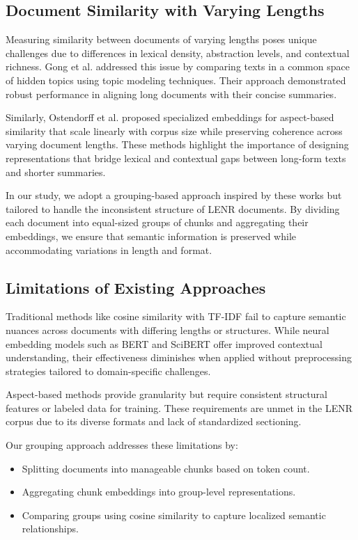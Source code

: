 \documentclass[12pt]{article}
\begin{document}
    \subsection{Document Similarity with Varying Lengths}
    
    Measuring similarity between documents of varying lengths poses unique challenges due to differences in lexical density, abstraction levels, and contextual richness. Gong et al. \cite{gong2018hidden} addressed this issue by comparing texts in a common space of hidden topics using topic modeling techniques. Their approach demonstrated robust performance in aligning long documents with their concise summaries.
    
    Similarly, Ostendorff et al. \cite{ostendorff2022specialized} proposed specialized embeddings for aspect-based similarity that scale linearly with corpus size while preserving coherence across varying document lengths. These methods highlight the importance of designing representations that bridge lexical and contextual gaps between long-form texts and shorter summaries.
    
    In our study, we adopt a grouping-based approach inspired by these works but tailored to handle the inconsistent structure of LENR documents. By dividing each document into equal-sized groups of chunks and aggregating their embeddings, we ensure that semantic information is preserved while accommodating variations in length and format.
    
    \subsection{Limitations of Existing Approaches}
    
    Traditional methods like cosine similarity with TF-IDF \cite{kdnuggets2025evaluating} fail to capture semantic nuances across documents with differing lengths or structures. While neural embedding models such as BERT \cite{devlin2019bert} and SciBERT \cite{beltagy2019scibert} offer improved contextual understanding, their effectiveness diminishes when applied without preprocessing strategies tailored to domain-specific challenges.
    
    Aspect-based methods \cite{ostendorff2020aspect} provide granularity but require consistent structural features or labeled data for training. These requirements are unmet in the LENR corpus due to its diverse formats and lack of standardized sectioning.
    
    Our grouping approach addresses these limitations by:
    \begin{itemize}
        \item Splitting documents into manageable chunks based on token count.
        \item Aggregating chunk embeddings into group-level representations.
        \item Comparing groups using cosine similarity to capture localized semantic relationships.
    \end{itemize}
    
\end{document}
